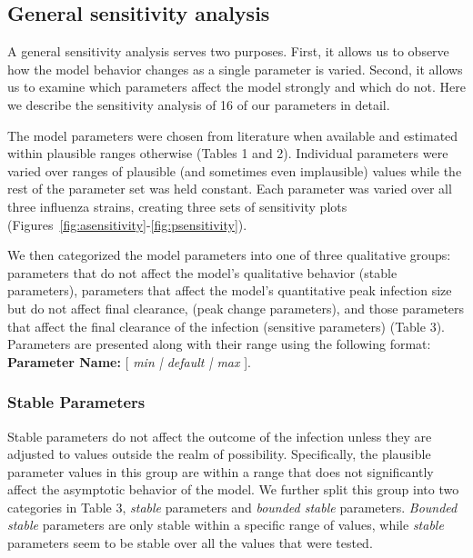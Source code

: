 \documentclass[10pt]{article}
\begin{document}
\subsection{General sensitivity analysis}

A general sensitivity analysis serves two purposes.  First, it allows us to observe how the model behavior changes as a single parameter is varied.  Second, it allows us to examine which parameters affect the model strongly and which do not.  Here we describe the sensitivity analysis of 16 of our parameters in detail.

The model parameters were chosen from literature when available and estimated within plausible ranges otherwise (Tables 1 and 2).  Individual parameters were varied over ranges of plausible (and sometimes even implausible) values while the rest of the parameter set was held constant.  Each parameter was varied over all three influenza strains, creating three sets of sensitivity plots (Figures~\ref{fig:asensitivity}-\ref{fig:psensitivity}).

We then categorized the model parameters into one of three qualitative groups: parameters that do not affect the model's qualitative behavior (stable parameters), parameters that affect the model's quantitative peak infection size but do not affect final clearance, (peak change parameters), and those parameters that affect the final clearance of the infection (sensitive parameters) (Table 3).  Parameters are presented along with their range using the following format:  \\

\textbf{Parameter Name:} [ \textit{min | default | max} ].


\subsubsection{Stable Parameters}

Stable parameters do not affect the outcome of the infection unless they are adjusted to values outside the realm of possibility.  Specifically, the plausible parameter values in this group are within a range that does not significantly affect the asymptotic behavior of the model.  We further split this group into two categories in Table 3, \textit{stable} parameters and \textit{bounded stable} parameters.  \textit{Bounded stable} parameters are only stable within a specific range of values, while \textit{stable} parameters seem to be stable over all the values that were tested.
\end{document}
